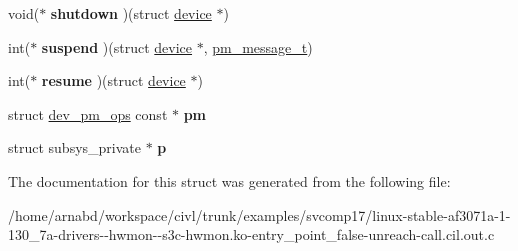 \begin{DoxyCompactItemize}
\item 
\hypertarget{structbus__type_acbfa68947a3927a5b32f2afc328076e4}{}void($\ast$ {\bfseries shutdown} )(struct \hyperlink{structdevice}{device} $\ast$)\label{structbus__type_acbfa68947a3927a5b32f2afc328076e4}

\item 
\hypertarget{structbus__type_aa23e6048f72b91ce22824aa268f9f2c7}{}int($\ast$ {\bfseries suspend} )(struct \hyperlink{structdevice}{device} $\ast$, \hyperlink{structpm__message}{pm\+\_\+message\+\_\+t})\label{structbus__type_aa23e6048f72b91ce22824aa268f9f2c7}

\item 
\hypertarget{structbus__type_a9e9d840a53eede307445566196005773}{}int($\ast$ {\bfseries resume} )(struct \hyperlink{structdevice}{device} $\ast$)\label{structbus__type_a9e9d840a53eede307445566196005773}

\item 
\hypertarget{structbus__type_a038d3b0001730989b452de2adaba3493}{}struct \hyperlink{structdev__pm__ops}{dev\+\_\+pm\+\_\+ops} const $\ast$ {\bfseries pm}\label{structbus__type_a038d3b0001730989b452de2adaba3493}

\item 
\hypertarget{structbus__type_adc8575a49ad25dbd11461e39dd67df6e}{}struct subsys\+\_\+private $\ast$ {\bfseries p}\label{structbus__type_adc8575a49ad25dbd11461e39dd67df6e}

\end{DoxyCompactItemize}


The documentation for this struct was generated from the following file\+:\begin{DoxyCompactItemize}
\item 
/home/arnabd/workspace/civl/trunk/examples/svcomp17/linux-\/stable-\/af3071a-\/1-\/130\+\_\+7a-\/drivers-\/-\/hwmon-\/-\/s3c-\/hwmon.\+ko-\/entry\+\_\+point\+\_\+false-\/unreach-\/call.\+cil.\+out.\+c\end{DoxyCompactItemize}
